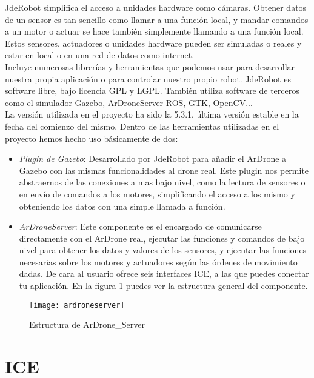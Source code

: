 JdeRobot simplifica el acceso a unidades hardware como cámaras. Obtener datos de un sensor es tan sencillo como llamar a una función local, y mandar comandos a un motor o actuar se hace también simplemente llamando a una función local. Estos sensores, actuadores o unidades hardware pueden ser simuladas o reales y estar en local o en una red de datos como internet.\\

Incluye numerosas librerías y herramientas que podemos usar para desarrollar nuestra propia aplicación o para controlar nuestro propio robot. JdeRobot es software libre, bajo licencia GPL y LGPL. También utiliza software de terceros como el simulador Gazebo, ArDroneServer ROS, GTK, OpenCV...\\

La versión utilizada en el proyecto ha sido la 5.3.1, última versión estable en la fecha del comienzo del mismo. Dentro de las herramientas utilizadas en el proyecto hemos hecho uso básicamente de dos:

\begin{itemize}
\item \emph{Plugin de Gazebo}: Desarrollado por JdeRobot para añadir el ArDrone a Gazebo con las mismas funcionalidades al drone real. Este plugin nos permite abstraernos de las conexiones a mas bajo nivel, como la lectura de sensores o en envío de comandos a los motores, simplificando el acceso a los mismo y obteniendo los datos con una simple llamada a función.

\item \emph{ArDroneServer}: Este componente es el encargado de comunicarse directamente con el ArDrone real, ejecutar las funciones y comandos de bajo nivel para obtener los datos y valores de los sensores, y ejecutar las funciones necesarias sobre los motores y actuadores según las órdenes de movimiento dadas. De cara al usuario ofrece seis interfaces ICE, a las que puedes conectar tu aplicación. En la figura \ref{fig:ardroneserver} puedes ver la estructura general del componente.
\end{itemize}

\begin{figure}[htb]
\centering
\texttt{[image: ardroneserver]}
\caption{Estructura de ArDrone\_Server}
\label{fig:ardroneserver}
\end{figure}

\section{ICE}

